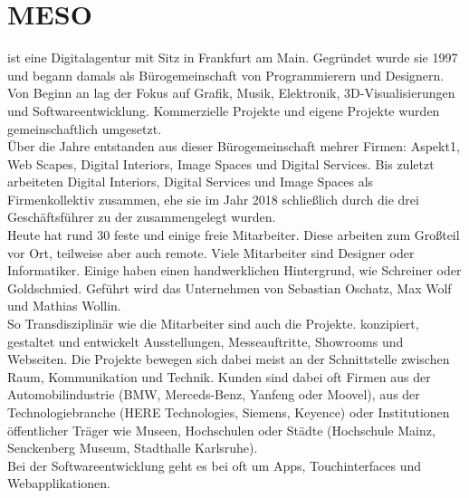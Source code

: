 \section{MESO}
\label{section:meso}

\mesoFull{} ist eine Digitalagentur mit Sitz in Frankfurt am Main.
Gegründet wurde sie 1997 und begann damals als Bürogemeinschaft von Programmierern
und Designern. Von Beginn an lag der Fokus auf Grafik, Musik, Elektronik, 3D-Visualisierungen
und Softwareentwicklung. Kommerzielle Projekte und eigene Projekte wurden gemeinschaftlich
umgesetzt.\\

Über die Jahre entstanden aus dieser Bürogemeinschaft mehrer Firmen: Aspekt1, \meso{} Web Scapes, \meso{}
Digital Interiors, \meso{} Image Spaces und \meso{} Digital Services. Bis zuletzt arbeiteten 
\meso{} Digital Interiors, \meso{} Digital Services und \meso{} Image Spaces als Firmenkollektiv zusammen, 
ehe sie im Jahr 2018 schließlich durch die drei Geschäftsführer zu der \mesoFull{} zusammengelegt
wurden.\\

Heute hat \meso{} rund 30 feste und einige freie Mitarbeiter. Diese arbeiten zum Großteil vor Ort, teilweise
aber auch remote. Viele Mitarbeiter sind Designer oder Informatiker. Einige haben einen handwerklichen
Hintergrund, wie Schreiner oder Goldschmied. Geführt wird das Unternehmen von Sebastian Oschatz, Max Wolf
und Mathias Wollin.\\
So Transdisziplinär wie die Mitarbeiter sind auch die Projekte. \meso{} konzipiert, gestaltet und entwickelt
Ausstellungen, Messeauftritte, Showrooms und Webseiten. Die Projekte bewegen sich dabei meist an der
Schnittstelle zwischen Raum, Kommunikation und Technik. Kunden sind dabei oft Firmen aus der
Automobilindustrie (BMW, Merceds-Benz, Yanfeng oder Moovel), aus der Technologiebranche (HERE Technologies,
Siemens, Keyence) oder Institutionen öffentlicher Träger wie Museen, Hochschulen oder Städte (Hochschule Mainz,
Senckenberg Museum, Stadthalle Karlsruhe).\\
Bei der Softwareentwicklung geht es bei \meso{} oft um Apps, Touchinterfaces und Webapplikationen.